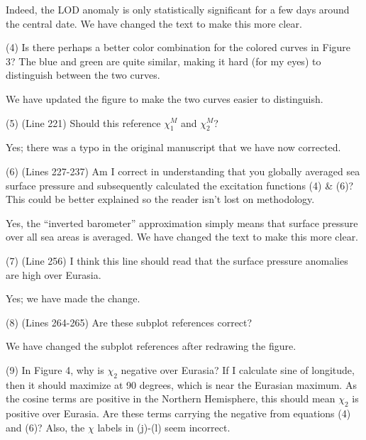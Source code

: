 \documentclass[a4paper,10pt]{article}
\begin{document}
Indeed, the LOD anomaly is only statistically significant for a few days around the central date.
We have changed the text to make this more clear.
\vspace{0.5cm}


\noindent \textcolor{reviewer}{(4) Is there perhaps a better color combination for the colored curves in Figure 3? The blue and green are quite similar, making it hard (for my eyes) to distinguish between the two curves.}
\vspace{0.5cm}

We have updated the figure to make the two curves easier to distinguish.
\vspace{0.5cm}


\noindent \textcolor{reviewer}{(5) (Line 221) Should this reference $\chi_1^M$ and $\chi_2^M$?}
\vspace{0.5cm}

Yes; there was a typo in the original manuscript that we have now corrected.
\vspace{0.5cm}


\noindent \textcolor{reviewer}{(6) (Lines 227-237) Am I correct in understanding that you globally averaged sea surface pressure and subsequently calculated the excitation functions (4) \& (6)? This could be better explained so the reader isn't lost on methodology.}
\vspace{0.5cm}

Yes, the ``inverted barometer'' approximation simply means that surface pressure over all sea areas is averaged. 
We have changed the text to make this more clear.
\vspace{0.5cm}


\noindent \textcolor{reviewer}{(7) (Line 256) I think this line should read that the surface pressure anomalies are high over Eurasia.}
\vspace{0.5cm}

Yes; we have made the change.
\vspace{0.5cm}


\noindent \textcolor{reviewer}{(8) (Lines 264-265) Are these subplot references correct?}
\vspace{0.5cm}

We have changed the subplot references after redrawing the figure.
\vspace{0.5cm}

\noindent \textcolor{reviewer}{(9) In Figure 4, why is $\chi_2$ negative over Eurasia? If I calculate sine of longitude, then it should maximize at 90 degrees, which is near the Eurasian maximum. As the cosine terms are positive in the Northern Hemisphere, this should mean $\chi_2$ is positive over Eurasia. Are these terms carrying the negative from equations (4) and (6)? Also, the $\chi$ labels in (j)-(l) seem incorrect.}
\vspace{0.5cm}
\end{document}
